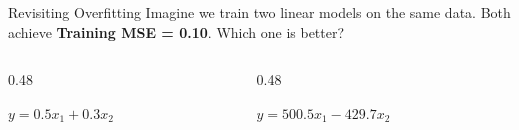 \begin{frame}{Revisiting Overfitting}
    Imagine we train two linear models on the same data. Both achieve \textbf{Training MSE = 0.10}.
    Which one is better?
    
    \vspace{1em}
    \begin{columns}[c]
        \begin{column}{0.48\textwidth}
            \begin{tcolorbox}[colback=green!5, title=Model A, center]
                $y = 0.5 x_1 + 0.3 x_2$
            \end{tcolorbox}
        \end{column}
        
        \begin{column}{0.48\textwidth}
            \begin{tcolorbox}[colback=red!5, title=Model B, center]
                $y = 500.5 x_1 - 429.7 x_2$
            \end{tcolorbox}
        \end{column}
    \end{columns}
\end{frame}


